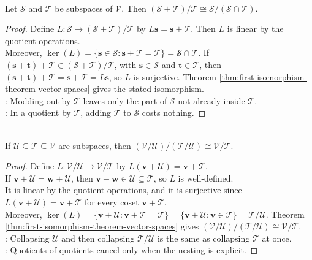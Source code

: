 \begin{theorem} \label{thm:second-isomorphism-vector-spaces} \\
Let $\mathcal{S}$ and $\mathcal{T}$ be subspaces of $\mathcal{V}$. Then $(\mathcal{S}+\mathcal{T})/\mathcal{T}\cong \mathcal{S}/(\mathcal{S}\cap\mathcal{T})$.
\begin{proof}
Define $L:\mathcal{S}\to(\mathcal{S}+\mathcal{T})/\mathcal{T}$ by $L\mathbf{s}=\mathbf{s}+\mathcal{T}$. Then $L$ is linear by the quotient operations.\\
Moreover, $\ker(L)=\{\mathbf{s}\in\mathcal{S}:\mathbf{s}+\mathcal{T}=\mathcal{T}\} =\mathcal{S}\cap\mathcal{T}$.
If $(\mathbf{s}+\mathbf{t})+\mathcal{T}\in(\mathcal{S}+\mathcal{T})/\mathcal{T}$, with $\mathbf{s}\in\mathcal{S}$ and $\mathbf{t}\in\mathcal{T}$, then $(\mathbf{s}+\mathbf{t})+\mathcal{T}=\mathbf{s}+\mathcal{T}=L\mathbf{s}$, so $L$ is surjective. Theorem \ref{thm:first-isomorphism-theorem-vector-spaces} gives the stated isomorphism.\\
: Modding out by $\mathcal{T}$ leaves only the part of $\mathcal{S}$ not already inside $\mathcal{T}$.\\
: In a quotient by $\mathcal{T}$, adding $\mathcal{T}$ to $\mathcal{S}$ costs nothing.
\end{proof}
\end{theorem}

\begin{theorem} \label{thm:third-isomorphism-vector-spaces} \\
If $\mathcal{U}\subseteq\mathcal{T}\subseteq\mathcal{V}$ are subspaces, then $(\mathcal{V}/\mathcal{U})/(\mathcal{T}/\mathcal{U})\cong \mathcal{V}/\mathcal{T}$.
\begin{proof}
Define $L:\mathcal{V}/\mathcal{U}\to\mathcal{V}/\mathcal{T}$ by $L(\mathbf{v}+\mathcal{U})=\mathbf{v}+\mathcal{T}$.\\
If $\mathbf{v}+\mathcal{U}=\mathbf{w}+\mathcal{U}$, then $\mathbf{v}-\mathbf{w}\in\mathcal{U}\subseteq\mathcal{T}$, so $L$ is well-defined.\\
It is linear by the quotient operations, and it is surjective since $L(\mathbf{v}+\mathcal{U})=\mathbf{v}+\mathcal{T}$ for every coset $\mathbf{v}+\mathcal{T}$.\\
Moreover, $\ker(L)=\{\mathbf{v}+\mathcal{U}: \mathbf{v}+\mathcal{T}=\mathcal{T}\} =\{\mathbf{v}+\mathcal{U}: \mathbf{v}\in\mathcal{T}\} =\mathcal{T}/\mathcal{U}$. Theorem \ref{thm:first-isomorphism-theorem-vector-spaces} gives $(\mathcal{V}/\mathcal{U})/(\mathcal{T}/\mathcal{U})\cong\mathcal{V}/\mathcal{T}$.\\
: Collapsing $\mathcal{U}$ and then collapsing $\mathcal{T}/\mathcal{U}$ is the same as collapsing $\mathcal{T}$ at once.\\
: Quotients of quotients cancel only when the nesting is explicit.
\end{proof}
\end{theorem}

